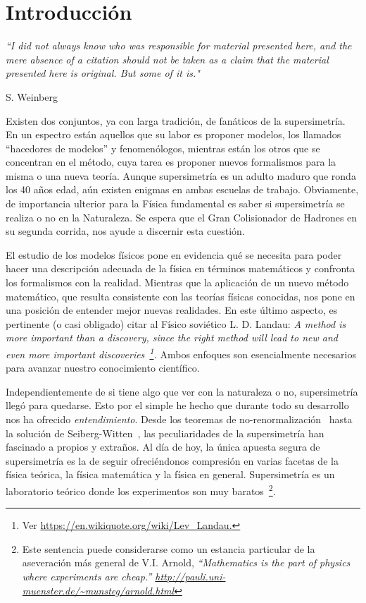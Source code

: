 \chapter{Introducción}
\label{sec:Intro}


\epigraph{\textit{``I did not always know who was responsible for material presented here, and the mere absence of a citation should not be taken as a claim that the material presented here is original. But some of it is."}}{S. Weinberg~\cite{Weinberg:1995mt}}


Existen dos conjuntos, ya con larga tradición, de fanáticos de la supersimetría. En un espectro están aquellos que su labor  es proponer modelos, los llamados  ``hacedores de modelos'' y fenomenólogos,   mientras están los otros que se concentran en el método, cuya tarea es proponer nuevos formalismos para la misma o una nueva teoría. Aunque supersimetría es un adulto maduro que ronda los   40 años edad, aún existen enigmas en ambas escuelas de trabajo.  Obviamente, de importancia ulterior para la  Física fundamental es  saber si supersimetría se realiza o no en la Naturaleza. Se espera  que el  Gran Colisionador de Hadrones en su segunda corrida, nos ayude a discernir esta cuestión. 

 El estudio de los modelos físicos pone en evidencia qué se necesita para poder hacer una descripción adecuada de la física en términos matemáticos y confronta los formalismos con la realidad. Mientras que la aplicación de un nuevo método matemático, que resulta consistente con las teorías físicas conocidas,  nos pone en una posición de entender mejor nuevas realidades. En este último aspecto,  es pertinente (o casi obligado) citar al Físico soviético L. D. Landau:
\textit{A method is more important than a discovery, since the right method will lead to new and even more important discoveries~\footnote{Ver \url{ https://en.wikiquote.org/wiki/Lev\_Landau.}}.}  Ambos enfoques son esencialmente necesarios para avanzar nuestro conocimiento científico.   


Independientemente de si tiene algo que ver con la naturaleza o no, supersimetría llegó para quedarse.  Esto por  el simple he hecho que durante todo su desarrollo nos ha ofrecido \emph{entendimiento}. Desde los teoremas de no-renormalización~\cite{Grisaru:1979wc} hasta la solución de Seiberg-Witten~\cite{Seiberg:1994rs}, las peculiaridades de la supersimetría han fascinado a propios y extraños. Al día de hoy,  la única apuesta segura de supersimetría es la de seguir ofreciéndonos compresión en varias facetas  de la física teórica, la física matemática y la  física en general. Supersimetría es un laboratorio teórico donde los experimentos son muy baratos~\footnote{Este sentencia puede considerarse como un estancia particular de la aseveración más general de V.I. Arnold,
\emph{``Mathematics is the part of physics where experiments are cheap.'' \url{http://pauli.uni-muenster.de/~munsteg/arnold.html}}}.

